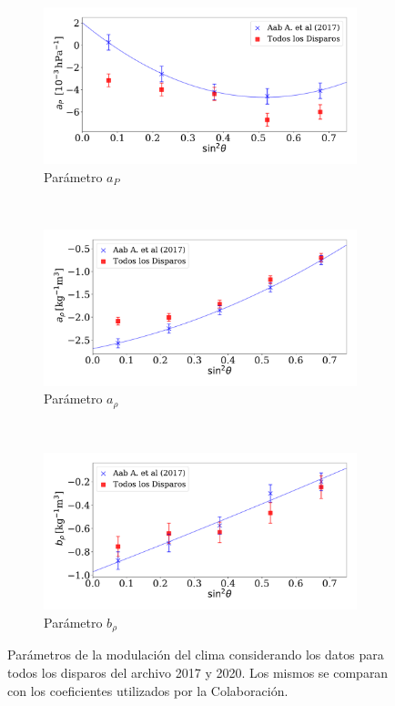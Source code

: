         \begin{figure}[H]
          \centering
          \begin{subfigure}[b]{0.8\textwidth}
          \includegraphics[width=\linewidth]{Graphs/params/ap_AllTriggers.pdf}
          \caption{Parámetro $a_P$ }
          \end{subfigure}\\
          \begin{subfigure}[b]{0.8\textwidth}
          \includegraphics[width=\linewidth]{Graphs/params/arho_AllTriggers.pdf}
          \caption{Parámetro $a_{\rho}$ }
          \end{subfigure}\\
          \begin{subfigure}[b]{\textwidth}
          \centering
          \includegraphics[width=0.8\linewidth]{Graphs/params/brho_AllTriggers.pdf}
          \caption{Parámetro  $b_\rho$   }
          \end{subfigure}
          \caption{Parámetros de la modulación del clima considerando los datos para todos los disparos del archivo 2017 y 2020. Los mismos se comparan con los coeficientes utilizados por la Colaboración.}
        \end{figure}

